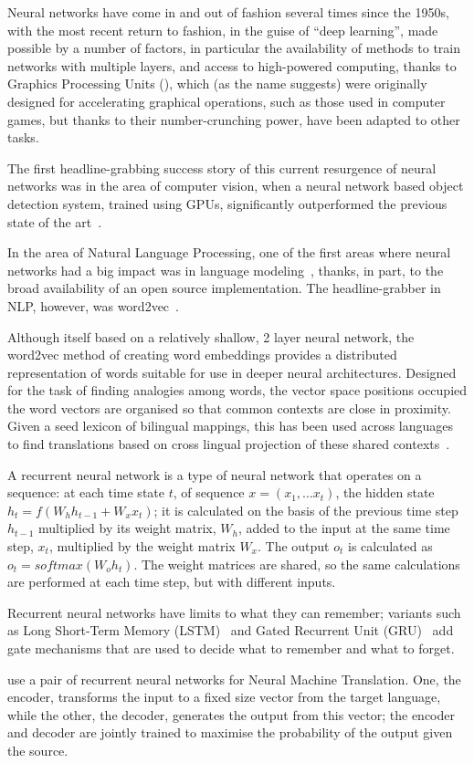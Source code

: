 Neural networks have come in and out of fashion several times since the 1950s, with the most recent
return to fashion, in the guise of ``deep learning'', made possible by a number of factors, in 
particular the availability of methods to train networks with multiple layers, and access to high-powered
computing, thanks to Graphics Processing Units (), which (as the name suggests) were originally
designed for accelerating graphical operations, such as those used in computer games, but thanks to their
number-crunching power, have been adapted to other tasks.

The first headline-grabbing success story of this current resurgence of neural networks was in the area
of computer vision, when a neural network based object detection system, trained using GPUs, significantly
outperformed the previous state of the art~\citep{NIPS2012_4824}.

In the area of Natural Language Processing, one of the first areas where neural networks had a big impact
was in language modeling~\citep{mikolov2012phd}, thanks, in part, to the broad availability of an open source
implementation. The headline-grabber in NLP, however, was word2vec~\citep{DBLP:journals/corr/abs-1301-3781}.

Although itself based on a relatively shallow, 2 layer neural network, the word2vec method of creating word
embeddings provides a distributed representation of words suitable for use in deeper neural architectures. Designed for the task of finding analogies among
words, the vector space positions occupied the word vectors are organised so that common contexts are close
in proximity. Given a seed lexicon of bilingual mappings, this has been used across languages to find
translations based on cross lingual projection of these shared contexts~\citep{44931}.

A recurrent neural network is a type of neural network that operates on a sequence: at each time state $t$,
of sequence $x = (x_1, \ldots x_t)$, the hidden state $h_t = f(W_{h}h_{t - 1} + W_{x}x_{t})$; it is calculated on the basis of the previous time step $h_{t - 1}$ multiplied by its weight matrix, $W_h$, added to the input at the same time step, $x_t$, multiplied by the weight matrix $W_x$. The output $o_t$ is calculated as $o_t = softmax(W_{o}h_t)$. The weight matrices are shared, so the same calculations are performed at each time step, but with different inputs.

Recurrent neural networks have limits to what they can remember; variants such as Long Short-Term Memory (LSTM)~\citep{Hochreiter:1997:LSM:1246443.1246450} and Gated Recurrent Unit (GRU)~\citep{cho2014rnnencdec} add gate mechanisms that are used to decide what to remember and what to forget. 

\citet{cho2014rnnencdec} use a pair of recurrent neural networks for Neural Machine Translation. One, the encoder, transforms the input to a fixed size vector from the target language, while the other, the decoder, generates the output from this vector; the encoder and decoder are jointly trained to maximise the probability of the output given the source.